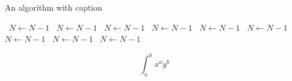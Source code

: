 \documentclass[a4paper]{article}
\begin{document}
\begin{algorithm}
\caption{An algorithm with caption}
\begin{algorithmic}
\    \State $N \gets N - 1$
\    \State $N \gets N - 1$
\    \State $N \gets N - 1$
\    \State $N \gets N - 1$
\    \State $N \gets N - 1$
\    \State $N \gets N - 1$
\    \State $N \gets N - 1$
\    \State $N \gets N - 1$
\    \State $N \gets N - 1$
\EndWhile
\end{algorithmic}
\end{algorithm}

\[ \int_{a}^{b}{x^{a}y^{b}} \]
\end{document}
